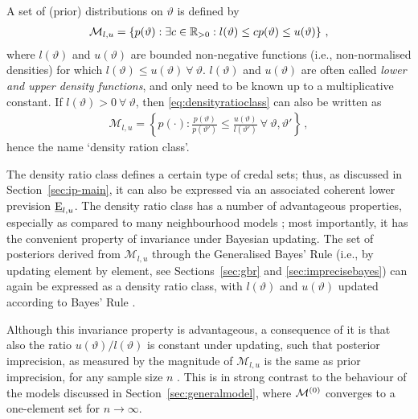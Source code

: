 A set of (prior) distributions on $\vartheta$ is defined by %
\begin{align}\label{eq:densityratioclass}
\mathcal{M}_{l,u} = \left\{ p(\vartheta) :
\exists c \in \mathbb{R}_{>0}: l(\vartheta) \le c p(\vartheta) \le u(\vartheta)\right\}\,,
\end{align}
where $l(\vartheta)$ and $u(\vartheta)$ are bounded non-negative functions (i.e., non-normalised densities)	
for which $l(\vartheta) \le u(\vartheta)\ \forall\ \vartheta$.
$l(\vartheta)$ and $u(\vartheta)$ are often called \emph{lower and upper density functions},
and only need to be known up to a multiplicative constant.
If $l(\vartheta)>0\ \forall\ \vartheta$, then \eqref{eq:densityratioclass} can also be written as
\begin{align*}
\mathcal{M}_{l,u} = \left\{ p(\cdot) :
\frac{p(\vartheta)}{p(\vartheta')} \le \frac{u(\vartheta)}{l(\vartheta')}\ \forall\ \vartheta, \vartheta' \right\}\,,
\end{align*}
hence the name `density ration class'.

The density ratio class defines a certain type of credal sets;
thus, as discussed in Section~\ref{sec:ip-main},
it can also be expressed via an associated coherent lower prevision $\underline{\operatorname{E}}_{l,u}$.
The density ratio class has a number of advantageous properties,
especially as compared to many neighbourhood models
\parencite[see, e.g.,][\S 2.3]{2011:rinderknecht};
most importantly, it has the convenient property of invariance under Bayesian updating.
The set of posteriors derived from $\mathcal{M}_{l,u}$
through the Generalised Bayes' Rule (i.e., by updating element by element,
see Sections~\ref{sec:gbr} and \ref{sec:imprecisebayes})
can again be expressed as a density ratio class,
with $l(\vartheta)$ and $u(\vartheta)$ updated according to Bayes' Rule \parencite{1981:derobertis}.

Although this invariance property is advantageous,
a consequence of it is that also the ratio $u(\vartheta)/l(\vartheta)$
is constant under updating, such that posterior imprecision,
as measured by the magnitude of $\mathcal{M}_{l,u}$ is the same as prior imprecision,
for any sample size $n$ \parencite[see, e.g.,][\S 4.2.2]{2011:rinderknecht:diss}.
This is in strong contrast to the behaviour of the models discussed in Section~\ref{sec:generalmodel},
where $\mathcal{M}^{(0)}$ converges to a %
one-element set for $n \to \infty$. 

